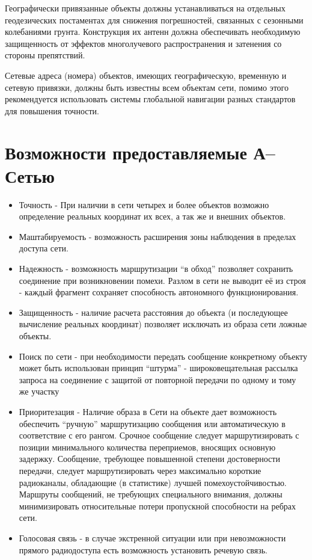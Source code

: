 \documentclass[a4paper,12pt]{report} %
\begin{document}
Географически привязанные объекты должны устанавливаться на отдельных
геодезических постаментах для снижения погрешностей, связанных с сезонными
колебаниями грунта. Конструкция их антенн должна обеспечивать необходимую
защищенность от эффектов многолучевого распространения и затенения со стороны
препятствий.

Сетевые адреса (номера) объектов, имеющих географическую, временную и сетевую
привязки, должны быть известны всем объектам сети, помимо этого рекомендуется
использовать системы глобальной навигации разных стандартов для повышения
точности.

\section{Возможности предоставляемые А--Сетью}

\begin{itemize}
\item Точность - При наличии в сети четырех и более объектов возможно
  определение реальных координат их всех, а так же и внешних объектов. 
\item Маштабируемость - возможность расширения зоны наблюдения в пределах
  доступа сети.
\item Надежность - возможность маршрутизации ``в обход'' позволяет сохранить
  соединение при возникновении помехи. Разлом в сети не выводит её из строя -
  каждый фрагмент сохраняет способность автономного функционирования.
\item Защищенность - наличие расчета расстояния до объекта (и последующее
  вычисление реальных координат) позволяет исключать из образа сети ложные
  объекты.
\item Поиск по сети - при необходимости передать сообщение конкретному объекту
  может быть использован принцип ``штурма'' - широковещательная рассылка запроса
  на соединение с защитой от повторной передачи по одному и тому же участку
\item Приоритезация - Наличие образа в Сети на объекте дает возможность
  обеспечить ``ручную'' маршрутизацию сообщения или автоматическую в
  соответствие с его рангом. Срочное сообщение следует маршрутизировать с
  позиции минимального количества переприемов,  вносящих основную задержку.
  Сообщение, требующее повышенной степени достоверности передачи, следует
  маршрутизировать через максимально короткие радиоканалы, обладающие (в
  статистике) лучшей помехоустойчивостью. Маршруты сообщений, не требующих
  специального внимания, должны минимизировать относительные потери пропускной
  способности на ребрах сети. 
\item Голосовая связь - в случае экстренной ситуации или при невозможности
  прямого радиодоступа есть возможность установить речевую связь.
\end{itemize}
\newpage
\end{document}
